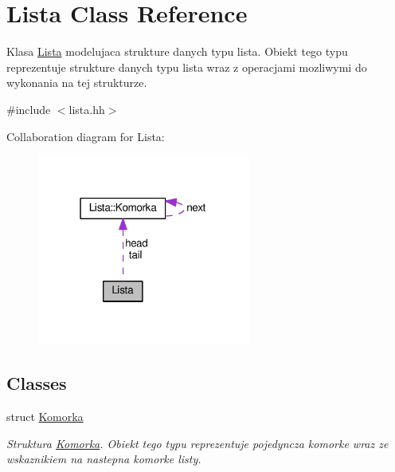 \hypertarget{class_lista}{}\section{Lista Class Reference}
\label{class_lista}


Klasa \hyperlink{class_lista}{Lista} modelujaca strukture danych typu lista. Obiekt tego typu reprezentuje strukture danych typu lista wraz z operacjami mozliwymi do wykonania na tej strukturze.  




{\ttfamily \#include $<$lista.\+hh$>$}



Collaboration diagram for Lista\+:\nopagebreak
\begin{figure}[H]
\begin{center}
\leavevmode
\includegraphics[width=199pt]{class_lista__coll__graph}
\end{center}
\end{figure}
\subsection*{Classes}
\begin{DoxyCompactItemize}
\item 
struct \hyperlink{struct_lista_1_1_komorka}{Komorka}
\begin{DoxyCompactList}\small\item\em Struktura \hyperlink{struct_lista_1_1_komorka}{Komorka}. Obiekt tego typu reprezentuje pojedyncza komorke wraz ze wskaznikiem na nastepna komorke listy. \end{DoxyCompactList}\end{DoxyCompactItemize}
